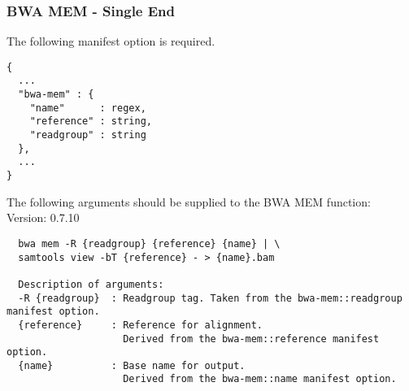 \subsubsection{BWA MEM - Single End}
The following manifest option is required.
\begin{verbatim}
{
  ...
  "bwa-mem" : {
    "name"      : regex,
    "reference" : string,
    "readgroup" : string
  },
  ...
}
\end{verbatim}
The following arguments should be supplied to the BWA MEM function:\\
Version: 0.7.10
\begin{verbatim}
  bwa mem -R {readgroup} {reference} {name} | \
  samtools view -bT {reference} - > {name}.bam

  Description of arguments:
  -R {readgroup}  : Readgroup tag. Taken from the bwa-mem::readgroup manifest option.
  {reference}     : Reference for alignment.
                    Derived from the bwa-mem::reference manifest option.
  {name}          : Base name for output.
                    Derived from the bwa-mem::name manifest option.
\end{verbatim}
